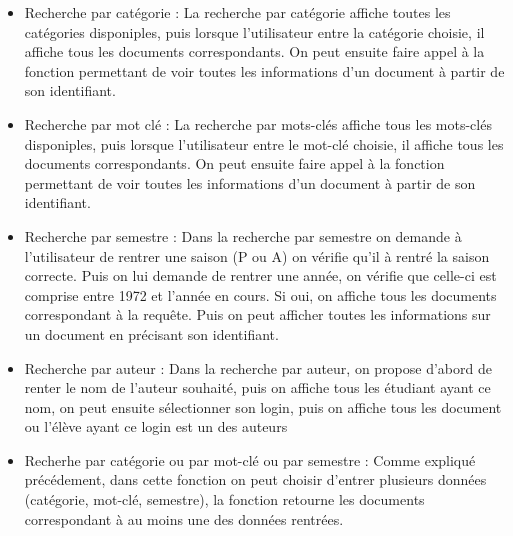 \documentclass[11pt]{report}
\begin{document}
\begin{itemize}
\item Recherche par catégorie : La recherche par catégorie affiche toutes les catégories disponiples, puis lorsque l'utilisateur entre la catégorie choisie, il affiche tous les documents correspondants. On peut ensuite faire appel à la fonction permettant de voir toutes les informations d'un document à partir de son identifiant. 

\item Recherche par mot clé : La recherche par mots-clés affiche tous les mots-clés disponiples, puis lorsque l'utilisateur entre le mot-clé choisie, il affiche tous les documents correspondants. On peut ensuite faire appel à la fonction permettant de voir toutes les informations d'un document à partir de son identifiant. 

\item Recherche par semestre : Dans la recherche par semestre on demande à l'utilisateur de rentrer une saison (P ou A) on vérifie qu'il à rentré la saison correcte. Puis on lui demande de rentrer une année, on vérifie que celle-ci est comprise entre 1972 et l'année en cours. Si oui, on affiche tous les documents correspondant à la requête. Puis on peut afficher toutes les informations sur un document en précisant son identifiant. 

\item Recherche par auteur : Dans la recherche par auteur, on propose d'abord de renter le nom de l'auteur souhaité, puis on affiche tous les étudiant ayant ce nom, on peut ensuite sélectionner son login, puis on affiche tous les document ou l'élève ayant ce login est un des auteurs

\item Recherhe par catégorie ou par mot-clé ou par semestre : Comme expliqué précédement, dans cette fonction on peut choisir d'entrer plusieurs données (catégorie, mot-clé, semestre), la fonction retourne les documents correspondant à au moins une des données rentrées. 
\end{itemize}
\end{document}
